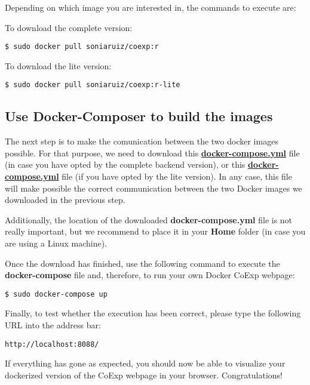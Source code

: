 \documentclass[]{book}
\begin{document}
Depending on which image you are interested in, the commands to execute
are:

To download the complete version:

\begin{verbatim}
$ sudo docker pull soniaruiz/coexp:r
\end{verbatim}

To download the lite version:

\begin{verbatim}
$ sudo docker pull soniaruiz/coexp:r-lite
\end{verbatim}

\subsection{Use Docker-Composer to build the
images}\label{use-docker-composer-to-build-the-images}

The next step is to make the comunication between the two docker images
possible. For that purpose, we need to download this
\href{https://github.com/SoniaRuiz/IPDGC/blob/master/complete/docker-compose.yml}{\textbf{docker-compose.yml}}
file (in case you have opted by the complete backend version), or this
\href{https://github.com/SoniaRuiz/IPDGC/blob/master/lite/docker-compose.yml}{\textbf{docker-compose.yml}}
file (if you have opted by the lite version). In any case, this file
will make possible the correct communication between the two Docker
images we downloaded in the previous step.

Additionally, the location of the downloaded \textbf{docker-compose.yml}
file is not really important, but we recommend to place it in your
\textbf{Home} folder (in case you are using a Linux machine).

Once the download has finished, use the following command to execute the
\textbf{docker-compose} file and, therefore, to run your own Docker
CoExp webpage:

\begin{verbatim}
$ sudo docker-compose up
\end{verbatim}

Finally, to test whether the execution has been correct, please type the
following URL into the address bar:

\begin{verbatim}
http://localhost:8088/
\end{verbatim}

If everything has gone as expected, you should now be able to visualize
your dockerized version of the CoExp webpage in your browser.
Congratulations!
\end{document}
